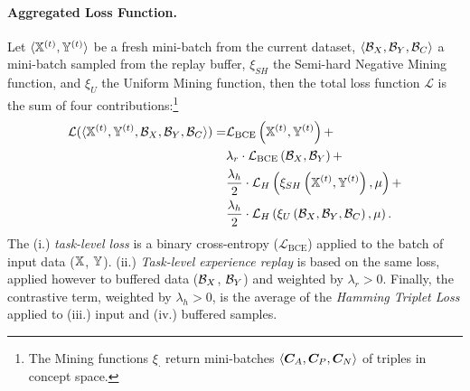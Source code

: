 \paragraph{Aggregated Loss Function.} Let $\langle{\mathbb{X}}^{(t)}, {\mathbb{Y}}^{(t)}\rangle$ be a fresh mini-batch from the current dataset, $\langle{\mathcal{B}}_X, {\mathcal{B}}_Y, {\mathcal{B}}_C\rangle$ a mini-batch sampled from the replay buffer, $\xi_{SH}$ the Semi-hard Negative Mining function, and $\xi_{U}$ the Uniform Mining function, then the total loss function $\mathcal{L}$ is the sum of four contributions:\footnote{The Mining functions $\xi_\cdot$ return mini-batches $\langle{\bm{C}}_A, {\bm{C}}_P, {\bm{C}}_N\rangle$ of triples in concept space.}
\begin{align*}
	\mathcal{L}(\langle {\mathbb{X}}^{(t)}, {\mathbb{Y}}^{(t)}, {\mathcal{B}}_X, {\mathcal{B}}_Y, {\mathcal{B}}_C \rangle) =&  \mathcal{L}_{\mathrm{BCE}}\left({\mathbb{X}}^{(t)}, {\mathbb{Y}}^{(t)}\right) + \\
	& \lambda_r \cdot \mathcal{L}_{\mathrm{BCE}}\left({\mathcal{B}}_X, {\mathcal{B}}_Y\right) + \\
	&\frac{\lambda_h}{2} \cdot \mathcal{L}_H\left(\xi_{SH}\left({\mathbb{X}}^{(t)}, {\mathbb{Y}}^{(t)}\right), \mu\right) +\\
	&\frac{\lambda_h}{2} \cdot \mathcal{L}_{H}\left(\xi_{U}\left({\mathcal{B}}_X, {\mathcal{B}}_Y, {\mathcal{B}}_C\right), \mu\right).
	\label{cem:eq:loss}  
\end{align*}
The (i.) \textit{task-level loss} is a binary cross-entropy ($\mathcal{L}_{\mathrm{BCE}}$) applied to the batch of input data (${\mathbb{X}}$, ${\mathbb{Y}}$). (ii.) \textit{Task-level experience replay} is based on the same loss, applied however to buffered data (${\mathcal{B}}_X$, ${\mathcal{B}}_Y$) and weighted by $\lambda_r > 0$. Finally, the contrastive term, weighted by $\lambda_h > 0$, is the average of the \textit{Hamming Triplet Loss} applied to (iii.) input and (iv.) buffered samples.






